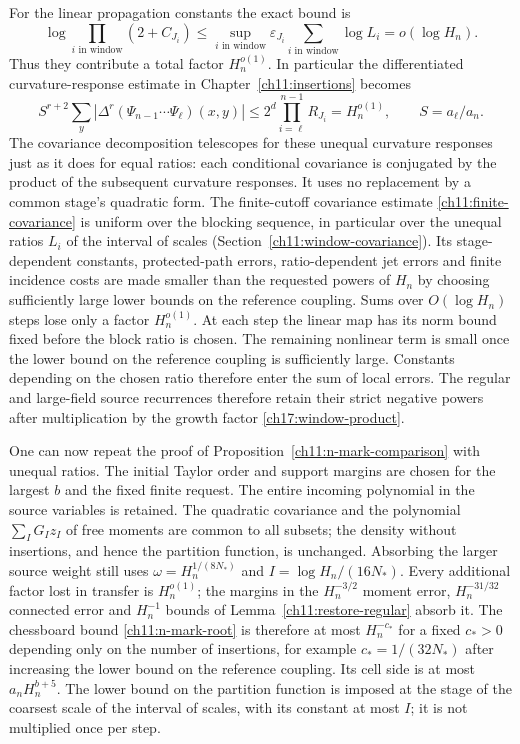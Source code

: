 For the linear propagation constants the exact bound is
\begin{equation}\label{ch17:window-product}
 \log\prod_{i\text{ in window}}(2+C_{J_i})
 \le\sup_{i\text{ in window}}\varepsilon_{J_i}
                \sum_{i\text{ in window}}\log L_i
 =o(\log H_n).
\end{equation}
Thus they contribute a total factor $H_n^{o(1)}$. In particular the differentiated
curvature-response estimate in Chapter~\ref{ch11:insertions} becomes
\[
 S^{r+2}\sum_y|\Delta^r(\Psi_{n-1}\cdots\Psi_\ell)(x,y)|
 \le 2^d\prod_{i=\ell}^{n-1}R_{J_i}=H_n^{o(1)},
 \qquad S=a_\ell/a_n.
\]
The covariance decomposition telescopes for these unequal
curvature responses just as it does for equal ratios: each conditional covariance
is conjugated by the product of the subsequent curvature responses.
It uses no replacement by a common stage's quadratic form.
The finite-cutoff covariance estimate \eqref{ch11:finite-covariance}
is uniform over the blocking sequence, in particular over the unequal ratios $L_i$ of the interval of scales (Section~\ref{ch11:window-covariance}). Its stage-dependent constants,
protected-path errors, ratio-dependent jet errors and finite incidence
costs are made smaller than the requested powers of $H_n$ by choosing
sufficiently large lower bounds on the reference coupling. Sums over $O(\log H_n)$ steps lose only a factor $H_n^{o(1)}$.
At each step the linear map has its norm bound fixed before the block
ratio is chosen. The remaining nonlinear term is small once the lower bound
on the reference coupling is sufficiently large. Constants depending on the chosen ratio
therefore enter the sum of local errors. The regular and large-field source recurrences therefore retain their
strict negative powers after multiplication by the growth factor
\eqref{ch17:window-product}.

One can now repeat the proof of
Proposition~\ref{ch11:n-mark-comparison} with unequal ratios.
The initial Taylor order and support margins are chosen for the
largest $b$ and the fixed finite request. The entire incoming
polynomial in the source variables is retained. The quadratic covariance
and the polynomial $\sum_IG_Iz_I$ of free moments are common to all subsets;
the density without insertions, and hence the partition function, is unchanged.
Absorbing the larger source weight still uses
$\omega=H_n^{1/(8N_*)}$ and $I=\log H_n/(16N_*)$.
Every additional factor lost in transfer is $H_n^{o(1)}$; the margins in the
$H_n^{-3/2}$ moment error, $H_n^{-31/32}$ connected error and
$H_n^{-1}$ bounds of Lemma~\ref{ch11:restore-regular} absorb it. The chessboard bound \eqref{ch11:n-mark-root} is
therefore at most $H_n^{-c_*}$ for a fixed $c_*>0$ depending only on
the number of insertions, for example $c_*=1/(32N_*)$ after increasing the lower bound on the reference coupling.
Its cell side is at most $a_nH_n^{b+5}$.
The lower bound on the partition function is imposed at the stage of the coarsest scale of the interval of scales,
with its constant at most $I$; it is not multiplied once per step.

